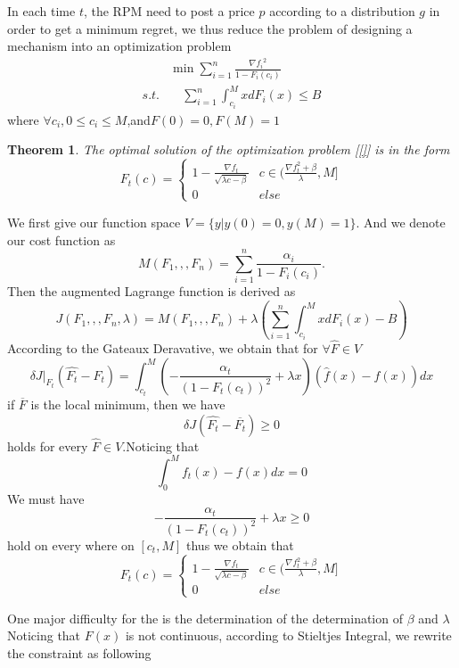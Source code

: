 \documentclass[10pt,conference,compsocconf,letterpaper]{IEEEtran}
\newtheorem{theorem}{Theorem}
\begin{document}
In each time $t$, the RPM need to post a price $p$ according to a distribution $g$ in order to get a minimum regret, we thus reduce the problem of designing a mechanism into an optimization problem
\begin{equation}
\begin{aligned}
&\min \sum_{i=1}^n \frac{{\nabla f_i}^2}{1-F_i(c_i)}\\
s.t. &\quad \sum_{i=1}^n\int_{c_i}^MxdF_i(x)\leq B
\end{aligned}
\end{equation}
where $\forall c_i,0\leq c_i\leq M$,and$F(0)=0,F(M)=1$
\begin{theorem}
The optimal solution of the optimization problem [\ref{}] is in the form 
\begin{equation}
F_t(c)=\begin{cases}
  1-\frac{\nabla f_t}{\sqrt{\lambda c-\beta}} &c\in(\frac{\nabla f_t^2+\beta}{\lambda},M]  \\
  0 & else 
\end{cases}
\end{equation}
\end{theorem}
\begin{IEEEproof}
We first give our function space $V=\{y|y(0)=0,y(M)=1\}$. And we denote our cost function as
\[M(F_1,,,F_n)= \sum_{i=1}^n \frac{\alpha_i}{1-F_i(c_i)}.\]
Then the augmented Lagrange function is derived as
\[J(F_1,,,F_n,\lambda)=M(F_1,,,F_n)+\lambda( \sum_{i=1}^n\int_{c_i}^MxdF_i(x)-B) \]
According to the Gateaux Deravative, we obtain that for $\forall \hat{F}\in V$
\[\delta J|_{F_t}(\hat{F_t}-F_t)=\int_{c_t}^M(-\frac{\alpha_t}{(1-F_t(c_t))^2}+\lambda x)(\hat{f}(x)-f(x))dx\]
if $\overline{F}$ is the local minimum, then we have
\[\delta J(\hat{F_t}-\overline{F_t})\geq 0\]
holds for every $\hat{F}\in V$.Noticing that
\[\int_0^Mf_t(x)-f(x)dx=0\]
We must have 
\[-\frac{\alpha_t}{(1-F_t(c_t))^2}+\lambda x\geq 0\]
hold on every where on $[c_t,M]$
thus we obtain that
\begin{equation}
F_t(c)=\begin{cases}
  1-\frac{\nabla f_t}{\sqrt{\lambda c-\beta}} &c\in(\frac{\nabla f_t^2+\beta}{\lambda},M]  \\
  0 & else 
\end{cases}
\end{equation}
\end{IEEEproof}
One major difficulty for the  is the determination of the determination of $\beta$ and $\lambda$
Noticing that $F(x)$ is not continuous, according to Stieltjes Integral, we rewrite the constraint as following
\end{document}
